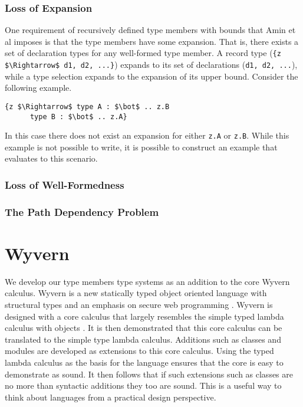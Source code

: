 \documentclass[11pt
              , a4paper
              , twoside
              , openright
              ]{report}
\numberwithin{case}{theorem}
\numberwithin{subcase}{case}
\begin{document}
\subsubsection{Loss of Expansion}
One requirement of recursively defined type members with bounds that Amin et al imposes is that the type members have some expansion. That is, there exists a set of declaration types for any well-formed type member. A record type (\verb|{z $\Rightarrow$ d1, d2, ...}|) expands to its set of declarations (\verb|d1, d2, ...|), while a type selection expands to the expansion of its upper bound. Consider the following example.
\begin{lstlisting}[mathescape, style=custom_lang]
{z $\Rightarrow$ type A : $\bot$ .. z.B
      type B : $\bot$ .. z.A}
\end{lstlisting}
In this case there does not exist an expansion for either \verb|z.A| or \verb|z.B|. While this example is not possible to write, it is possible to construct an example that evaluates to this scenario.
\subsubsection{Loss of Well-Formedness}

\subsubsection{The Path Dependency Problem}







\section{Wyvern}\label{s:wyvern}
We develop our type members type systems as an addition to the core Wyvern calculus. Wyvern is a new statically typed object oriented language with structural types and an emphasis on secure web programming \cite{wyvern2016}. Wyvern is designed with a core calculus that largely resembles the simple typed lambda calculus with objects \cite{Nistor:2013:WST:2489828.2489830}. It is then demonstrated that this core calculus can be translated to the simple type lambda calculus. Additions such as classes and modules are developed as extensions to this core calculus. Using the typed lambda calculus as the basis for the language ensures that the core is easy to demonstrate as sound. It then follows that if such extensions such as classes are no more than syntactic additions they too are sound. This is a useful way to think about languages from a practical design perspective.
\end{document}
